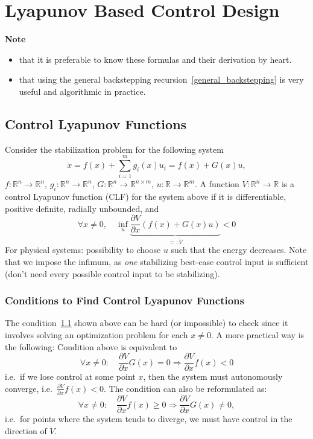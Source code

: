 \section{Lyapunov Based Control Design}
\textbf{Note}

\begin{itemize}
    \item that it is preferable to know these formulas and their derivation by heart.
    \item that using the general backstepping recursion~\ref{general_backstepping} is very useful and algorithmic in practice.
\end{itemize}

\subsection{Control Lyapunov Functions}\label{CLF}
Consider the stabilization problem for the following system
\begin{equation*}
    \dot{x} = f(x) + \sum_{i=1}^m g_i(x) u_i = f(x) + G(x)u,
\end{equation*}
$f:\mathbb{R}^n\to\mathbb{R}^n$, $g_i : \mathbb{R}^n \to \mathbb{R}^n$, $G : \mathbb{R}^n \to \mathbb{R}^{n \times m}$, $u : \mathbb{R} \to \mathbb{R}^m$.
\newpar{}
A function $V : \mathbb{R}^n \to \mathbb{R}$ is a control Lyapunov function (CLF) for the system above if it is differentiable, positive definite, radially unbounded, and
\begin{equation*}
    \forall x \neq 0, \quad \inf_u \underbrace{\frac{\partial V}{\partial x}(f(x) + G(x)u)}_{=:\dot{V}} < 0
\end{equation*}
For physical systems: possibility to choose $u$ such that the energy decreases. Note that we impose the infimum, as \textit{one} stabilizing best-case control input is sufficient (don't need every possible control input to be stabilizing).

\subsubsection{Conditions to Find Control Lyapunov Functions}

The condition~\ref{CLF} shown above can be hard (or impossible) to check since it involves solving an optimization problem for each $x \neq 0$. A more practical way is the following:
\newpar{}
Condition above is equivalent to
\begin{equation*}
    \forall x \neq 0: \quad \frac{\partial V}{\partial x} G(x) = 0 \Rightarrow \frac{\partial V}{\partial x} f(x) < 0
\end{equation*}
i.e.\ if we lose control at some point $x$, then the system must autonomously converge, i.e.\ $\frac{\partial V}{\partial x} f(x)<0$.
\newpar{}
The condition can also be reformulated as:
\begin{equation*}
    \forall x \neq 0: \quad \frac{\partial V}{\partial x} f(x) \geq 0 \Rightarrow \frac{\partial V}{\partial x} G(x) \neq 0,
\end{equation*}
i.e.\ for points where the system tends to diverge, we must have control in the direction of $\dot{V}$.
